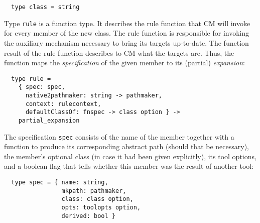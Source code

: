 \begin{verbatim}
  type class = string
\end{verbatim}

Type {\tt rule} is a function type.  It describes the rule function
that CM will invoke for every member of the new class. The rule
function is responsible for invoking the auxiliary mechanism necessary
to bring its targets up-to-date.  The function result of the rule
function describes to CM what the targets are.  Thus, the function
maps the {\em specification} of the given member to its (partial) {\em
expansion}:

\begin{verbatim}
  type rule =
    { spec: spec,
      native2pathmaker: string -> pathmaker,
      context: rulecontext,
      defaultClassOf: fnspec -> class option } ->
    partial_expansion
\end{verbatim}

The specification {\tt spec} consists of the name of the member
together with a function to produce its corresponding abstract
path (should that be necessary), the member's optional class (in case
it had been given explicitly), its tool options, and a boolean flag
that tells whether this member was the result of another tool:

\begin{verbatim}
  type spec = { name: string,
                mkpath: pathmaker,
                class: class option,
                opts: toolopts option,
                derived: bool }
\end{verbatim}

